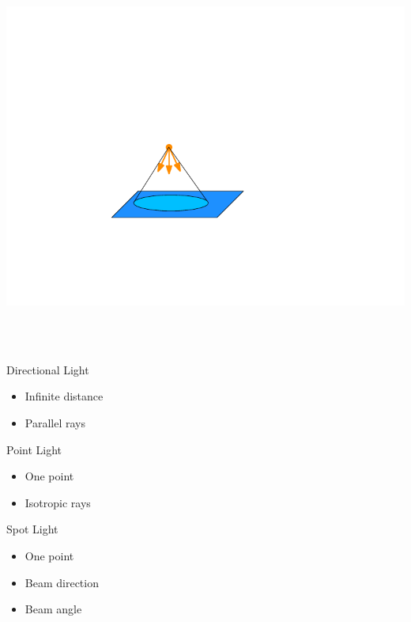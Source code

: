 \documentclass[utf8,stillsansserifmath,fleqn,t]{beamer}
\begin{document}
\begin{frame}[label=intro-light-types]
\begin{minipage}{.33\textwidth}
\includegraphics[width=\textwidth]{./fig/lightsource-spot.pdf}
\end{minipage}\\~\\
\begin{minipage}[t]{.33\textwidth}
Directional Light
\begin{itemize}
\item Infinite distance
\item Parallel rays
\end{itemize}
\end{minipage}\hfill
\begin{minipage}[t]{.33\textwidth}
Point Light
\begin{itemize}
\item One point
\item Isotropic rays
\end{itemize}
\end{minipage}\hfill
\begin{minipage}[t]{.33\textwidth}
Spot Light
\begin{itemize}
\item One point
\item Beam direction
\item Beam angle
\end{itemize}
\end{minipage}\\
\end{frame}
\end{document}
